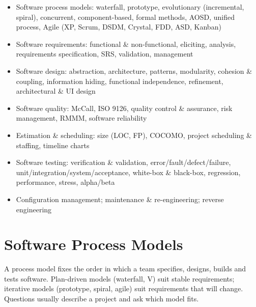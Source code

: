 

\begin{sylbox}

\begin{itemize}
\tightlist
\item[$\square$]
  Software process models: waterfall, prototype, evolutionary (incremental, spiral), concurrent, component-based, formal methods, AOSD, unified process, Agile (XP, Scrum, DSDM, Crystal, FDD, ASD, Kanban)
\item[$\square$]
  Software requirements: functional \& non-functional, eliciting, analysis, requirements specification, SRS, validation, management
\item[$\square$]
  Software design: abstraction, architecture, patterns, modularity, cohesion \& coupling, information hiding, functional independence, refinement, architectural \& UI design
\item[$\square$]
  Software quality: McCall, ISO 9126, quality control \& assurance, risk management, RMMM, software reliability
\item[$\square$]
  Estimation \& scheduling: size (LOC, FP), COCOMO, project scheduling \& staffing, timeline charts
\item[$\square$]
  Software testing: verification \& validation, error/fault/defect/failure, unit/integration/system/acceptance, white-box \& black-box, regression, performance, stress, alpha/beta
\item[$\square$]
  Configuration management; maintenance \& re-engineering; reverse engineering
\end{itemize}

\end{sylbox}

\needspace{161pt}

\hypertarget{p2-06--1-software-process-models}{%
\section{Software Process Models}\label{p2-06--1-software-process-models}}

A process model fixes the order in which a team specifies, designs, builds and tests software. Plan-driven
models (waterfall, V) suit stable requirements; iterative models (prototype, spiral, agile) suit
requirements that will change. Questions usually describe a project and ask which model fits.

